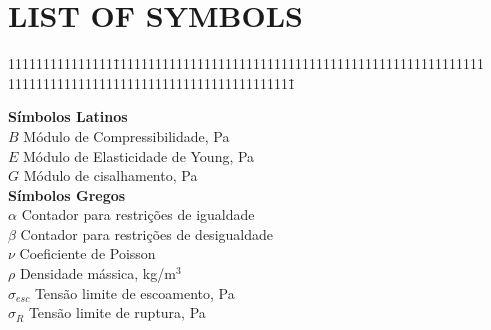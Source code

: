 \chapter*{\hfill LIST OF SYMBOLS \hfill}


\begin{tabbing}
111111111111111\=11111111111111111111111111111111111111111111111111111
11111111111111111111111111111111111111111\=\kill

\textbf{Símbolos Latinos}\\

$B$ \>  Módulo de Compressibilidade, Pa \\

$E$ \>  Módulo de Elasticidade de Young, Pa \\

$G$  \>  Módulo de cisalhamento, Pa \\


\textbf{Símbolos Gregos}\\

$\alpha$ \>  Contador para restrições de igualdade \\

$\beta$   \>  Contador para restrições de desigualdade \\

$\nu$   \>  Coeficiente de Poisson \\

$\rho$   \>  Densidade mássica, kg/m$^3$ \\

$\sigma_{esc}$   \>  Tensão limite de escoamento, Pa \\

$\sigma_{R}$   \>  Tensão limite de ruptura, Pa \\

\end{tabbing}
